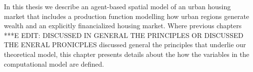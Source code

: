 






In this thesis  we describe an agent-based spatial model of an urban housing market that includes a production function modelling how urban regions generate wealth and an explicitly financialized housing market.  Where previous chapters ***E EDIT: DISCUSSED IN GENERAL THE PRINCIPLES OR DISCUSSED THE ENERAL PRONICPLES discussed general the principles that underlie our theoretical model, this chapter presents details about the how the variables in the computational model are defined. %

